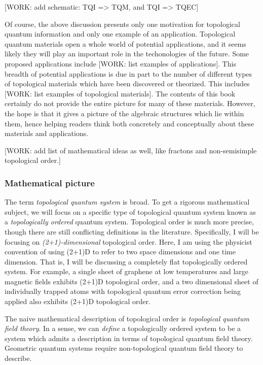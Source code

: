 \documentclass{article}
\theoremstyle{definition}
\numberwithin{figure}{section}
\begin{document}
[WORK: add schematic: TQI => TQM, and TQI => TQEC]

Of course, the above discussion presents only one motivation for topological quantum information and only one example of an application. Topological quantum materials open a whole world of potential applications, and it seems likely they will play an important role in the techonologies of the future. Some proposed applications include [WORK: list examples of applications]. This breadth of potential applications is due in part to the number of different types of topological materials which have been discovered or theorized. This includes [WORK: list examples of topological materials]. The contents of this book certainly do not provide the entire picture for many of these materials. However, the hope is that it gives a picture of the algebraic structures which lie within them, hence helping readers think both concretely and conceptually about these materials and applications.

[WORK: add list of mathematical ideas as well, like fractons and non-semisimple topological order.]

\subsubsection{Mathematical picture}

The term \textit{topological quantum system} is broad. To get a rigorous mathematical subject, we will focus on a specific type of topological quantum system known as a \textit{topologically ordered} quantum system. Topological order is much more precise, though there are still conflicting definitions in the literature. Specifically, I will be focusing on \textit{(2+1)-dimensional} topological order. Here, I am using the physicist convention of using (2+1)D to refer to two space dimensions and one time dimension. That is, I will be discussing a completely flat topologically ordered system. For example, a single sheet of graphene at low temperatures and large magnetic fields exhibits (2+1)D topological order, and a two dimensional sheet of individually trapped atoms with topological quantum error correction being applied also exhibits (2+1)D topological order.

The naive mathematical description of topological order is \textit{topological quantum field theory}. In a sense, we can \textit{define} a topologically ordered system to be a system which admits a description in terms of topological quantum field theory. Geometric quantum systems require non-topological quantum field theory to describe.
\end{document}
